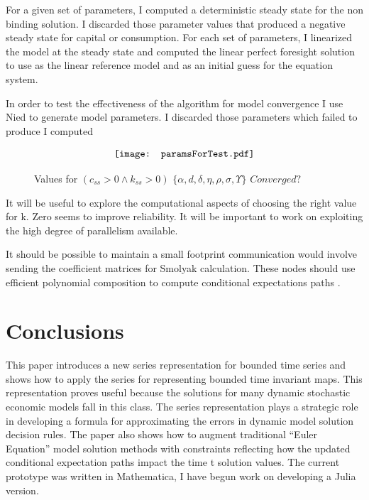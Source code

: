 \documentclass[12pt]{article}
\begin{document}
For a given set of parameters, I computed a deterministic 
steady state for the non binding solution.  I discarded
those parameter values that produced a negative steady state for capital or 
consumption.  For each set of parameters,
I linearized the model at the steady state and computed
the linear perfect foresight solution to use as the linear reference model and
as an initial guess for the equation system.

In order to test the effectiveness of the 
algorithm for model convergence I use Nied to generate model parameters.
I discarded those parameters which failed to produce 
I computed





\begin{figure}
  \centering
  
  \caption{Values for $(c_{ss}>0\wedge k_{ss}>0)\,\,\{\alpha,d,\delta,\eta,\rho,\sigma,\Upsilon\}\,\, Converged?$}
\begin{gather}
\vcenter{\hbox{\texttt{[image: paramsForTest.pdf]}}}
\end{gather}
\end{figure}


It will be useful to explore the computational aspects of choosing the right value for k.  Zero seems to improve reliability.
It will be important to work on exploiting the high degree of parallelism 
available.

It should be possible to maintain a small footprint communication would involve
sending the coefficient matrices for Smolyak calculation.  These nodes
should use efficient polynomial composition to compute conditional expectations
paths .
\section{Conclusions}
This paper introduces a new series representation for bounded time series and
shows how to apply the series for representing bounded time invariant maps.
This representation proves useful because the solutions for many
dynamic stochastic economic models fall in this class.
The series representation plays a strategic role in developing a formula for approximating the errors in dynamic model solution decision rules.  The paper
also shows how to  augment traditional ``Euler Equation'' model solution
methods with constraints reflecting how the updated
conditional expectation paths impact the time t solution values.
The current prototype was written in Mathematica,  I have begun work on developing a Julia version.
\end{document}
